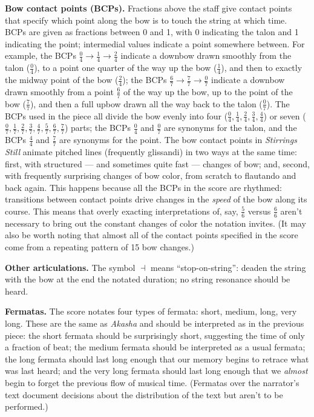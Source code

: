 \textbf{Bow contact points (BCPs).} Fractions above the staff give contact points that
specify which point along the bow is to touch the string at which time. BCPs are given as
fractions between 0 and 1, with 0 indicating the talon and 1 indicating the point;
intermedial values indicate a point somewhere between. For example, the BCPs $\frac{0}{4}
\longrightarrow \frac{1}{4} \longrightarrow \frac{2}{4}$ indicate a downbow drawn
smoothly from the talon ($\frac{0}{4}$), to a point one quarter of the way up the bow
($\frac{1}{4}$), and then to exactly the midway point of the bow ($\frac{2}{4}$); the
BCPs $\frac{6}{7} \longrightarrow \frac{7}{7} \longrightarrow \frac{0}{7}$ indicate a
downbow drawn smoothly from a point $\frac{6}{7}$ of the way up the bow, up to the point
of the bow ($\frac{7}{7}$), and then a full upbow drawn all the way back to the talon
($\frac{0}{7}$). The BCPs used in the piece all divide the bow evenly into four
($\frac{0}{4}, \frac{1}{4}, \frac{2}{4}, \frac{3}{4}, \frac{4}{4}$) or seven
($\frac{0}{7}, \frac{1}{7}, \frac{2}{7}, \frac{3}{7}, \frac{4}{7}, \frac{5}{7},
\frac{6}{7}, \frac{7}{7}$) parts; the BCPs $\frac{0}{4}$ and $\frac{0}{7}$ are synonyms
for the talon, and the BCPs $\frac{4}{4}$ and $\frac{7}{7}$ are synonyms for the point.
The bow contact points in \textit{Stirrings Still} animate pitched lines (frequently
glissandi) in two ways at the same time: first, with structured --- and sometimes quite
fast --- changes of bow; and, second, with frequently surprising changes of bow color,
from scratch to flautando and back again. This happens because all the BCPs in the score
are rhythmed: transitions between contact points drive changes in the \textit{speed} of
the bow along its course. This means that overly exacting interpretations of, say,
$\frac{5}{6}$ versus $\frac{6}{6}$ aren't necessary to bring out the constant changes of
color the notation invites. (It may also be worth noting that almost all of the contact
points specified in the score come from a repeating pattern of 15 bow changes.)

\textbf{Other articulations.} The symbol $\dashv$ means ``stop-on-string'': deaden the
string with the bow at the end the notated duration; no string resonance should be heard.

\textbf{Fermatas.} The score notates four types of fermata: short, medium, long, very
long. These are the same as \textit{Akasha} and should be interpreted as in the previous
piece: the short fermata should be surprisingly short, suggesting the time of only a
fraction of beat; the medium fermata should be interpreted as a usual fermata; the long
fermata should last long enough that our memory begins to retrace what was last heard;
and the very long fermata should last long enough that we \textit{almost} begin to forget
the previous flow of musical time. (Fermatas over the narrator's text document decisions
about the distribution of the text but aren't to be performed.)

